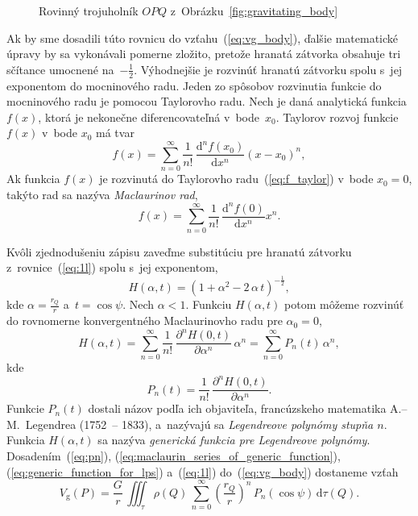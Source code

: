 \documentclass[a4paper,12pt]{book}
\newcommand{\diff}{\mathrm d}
\newcommand{\gidx}{\mathrm g}
\begin{document}
\begin{figure}
\centering

\caption{Rovinný trojuholník $OPQ$ z~Obrázku~\ref{fig:gravitating_body}}
\label{fig:distance_l}
\end{figure}

Ak by sme dosadili túto rovnicu do vzťahu~(\ref{eq:vg_body}), ďalšie
matematické úpravy by sa vykonávali pomerne zložito, pretože hranatá zátvorka
obsahuje tri sčítance umocnené na~$-\frac{1}{2}$.  Výhodnejšie je rozvinúť
hranatú zátvorku spolu s~jej exponentom do mocninového radu.  Jeden zo spôsobov
rozvinutia funkcie do mocninového radu je pomocou Taylorovho radu.  Nech je 
daná analytická funkcia $f(x)$, ktorá je nekonečne diferencovateľná 
v~bode~$x_0$.  Taylorov rozvoj funkcie~$f(x)$ v~bode $x_0$ má tvar
%
\begin{equation}
\label{eq:f_taylor}
f(x) = \sum_{n = 0}^\infty \frac{1}{n!} \, \frac{\diff^n f(x_0)}{\diff x^n} (x 
- x_0)^n{,}
\end{equation}
%
Ak funkcia $f(x)$ je rozvinutá do Taylorovho radu~(\ref{eq:f_taylor}) v~bode 
$x_0 = 0$, takýto rad sa nazýva \emph{Maclaurinov rad},
%
\begin{equation}
f(x) = \sum_{n = 0}^\infty \frac{1}{n!} \, \frac{\diff^n f(0)}{\diff x^n}
x^n{.}
\end{equation}

Kvôli zjednodušeniu zápisu zaveďme substitúciu pre hranatú zátvorku
z~rovnice~(\ref{eq:1l}) spolu s~jej exponentom,
%
\begin{equation}
\label{eq:generic_function_for_lps}
H(\alpha, t) = \left(1 + \alpha^2 - 2 \, \alpha\, t \right)^{-\frac{1}{2}}{,}
\end{equation}
%
kde $\alpha = \frac{r_Q}{r}$ a~$t = \cos\psi$.  Nech $\alpha < 1$.  Funkciu
$H(\alpha, t)$ potom môžeme rozvinúť do rovnomerne konvergentného Maclaurinovho
radu pre $\alpha_0 = 0$,
%
\begin{equation}
\label{eq:maclaurin_series_of_generic_function}
H(\alpha, t) = \sum_{n = 0}^\infty \frac{1}{n!} \, \frac{\partial^n H(0,
t)}{\partial \alpha^n} \, \alpha^n = \sum_{n = 0}^\infty P_n(t) \, \alpha^n{,}
\end{equation}
%
kde
%
\begin{equation}
\label{eq:pn}
P_n(t) = \frac{1}{n!} \, \frac{\partial^n H(0, t)}{\partial \alpha^n}{.}
\end{equation}
%
Funkcie $P_n(t)$ dostali názov podľa ich objaviteľa, francúzskeho matematika
A.--M.~Legendrea (1752~-- 1833), a~nazývajú sa \emph{Legendreove polynómy
stupňa $n$}.  Funkcia $H(\alpha, t)$ sa nazýva \emph{generická funkcia pre
Legendreove polynómy}.  Dosadením~(\ref{eq:pn}),
(\ref{eq:maclaurin_series_of_generic_function}),
(\ref{eq:generic_function_for_lps}) a~(\ref{eq:1l}) do~(\ref{eq:vg_body})
dostaneme vzťah
%
\begin{equation}
\label{eq:vg_legpol}
V_\gidx(P) = \frac{G}{r} \, \iiint_{\tau} \rho(Q) \, \sum_{n = 0}^{\infty}
\left( \frac{r_Q}{r} \right)^n \, P_n(\cos\psi) \, \diff\tau(Q){.}
\end{equation}
\end{document}
